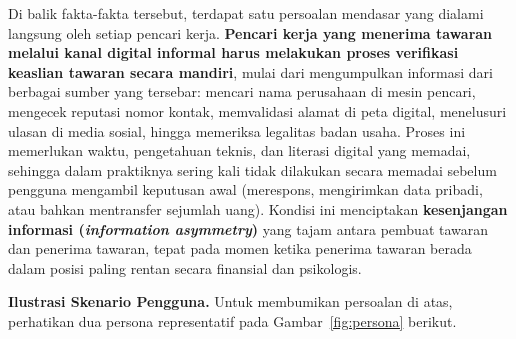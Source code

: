 \documentclass[12pt,a4paper]{article}
\begin{document}
Di balik fakta-fakta tersebut, terdapat satu persoalan mendasar yang dialami langsung oleh setiap
pencari kerja. \textbf{Pencari kerja yang menerima tawaran melalui kanal digital informal harus
melakukan proses verifikasi keaslian tawaran secara mandiri}, mulai dari mengumpulkan informasi dari
berbagai sumber yang tersebar: mencari nama perusahaan di mesin pencari, mengecek reputasi nomor
kontak, memvalidasi alamat di peta digital, menelusuri ulasan di media sosial, hingga memeriksa
legalitas badan usaha. Proses ini memerlukan waktu, pengetahuan teknis, dan literasi digital yang
memadai, sehingga dalam praktiknya sering kali tidak dilakukan secara memadai sebelum pengguna
mengambil keputusan awal (merespons, mengirimkan data pribadi, atau bahkan mentransfer sejumlah
uang). Kondisi ini menciptakan \textbf{kesenjangan informasi (\textit{information asymmetry})} yang
tajam antara pembuat tawaran dan penerima tawaran, tepat pada momen ketika penerima tawaran berada
dalam posisi paling rentan secara finansial dan psikologis.

\vspace{0.3cm}
\textbf{Ilustrasi Skenario Pengguna.} Untuk membumikan persoalan di atas, perhatikan dua persona
representatif pada Gambar~\ref{fig:persona} berikut.
\end{document}
